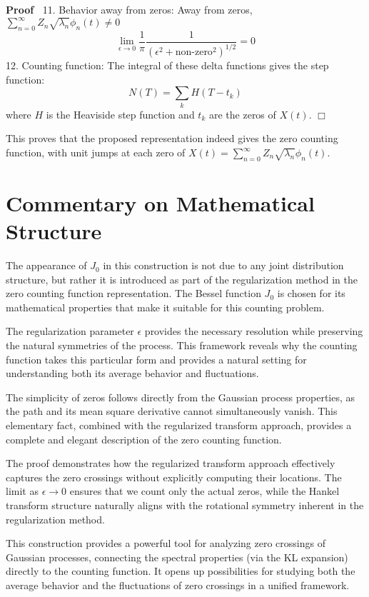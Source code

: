 \documentclass{article}
\newenvironment{proof}{\noindent\textbf{Proof\ }}{\hspace*{\fill}$\Box$\medskip}
\begin{document}
\begin{proof}
  11. Behavior away from zeros: Away from zeros, $\sum_{n = 0}^{\infty} Z_n 
  \sqrt{\lambda_n} \phi_n (t) \neq 0$
  \begin{equation}
    \lim_{\epsilon \to 0}  \frac{1}{\pi}  \frac{1}{(\epsilon^2 +
    \text{non-zero}^2)^{1 / 2}} = 0
  \end{equation}
  12. Counting function: The integral of these delta functions gives the step
  function:
  \begin{equation}
    N (T) = \sum_k H (T - t_k)
  \end{equation}
  where $H$ is the Heaviside step function and $t_k$ are the zeros of $X (t)$.
\end{proof}

This proves that the proposed representation indeed gives the zero counting
function, with unit jumps at each zero of $X (t) = \sum_{n = 0}^{\infty} Z_n 
\sqrt{\lambda_n} \phi_n (t)$.

\section*{Commentary on Mathematical Structure}

The appearance of $J_0$ in this construction is not due to any joint
distribution structure, but rather it is introduced as part of the
regularization method in the zero counting function representation. The Bessel
function $J_0$ is chosen for its mathematical properties that make it suitable
for this counting problem.

The regularization parameter $\epsilon$ provides the necessary resolution
while preserving the natural symmetries of the process. This framework reveals
why the counting function takes this particular form and provides a natural
setting for understanding both its average behavior and fluctuations.

The simplicity of zeros follows directly from the Gaussian process properties,
as the path and its mean square derivative cannot simultaneously vanish. This
elementary fact, combined with the regularized transform approach, provides a
complete and elegant description of the zero counting function.

The proof demonstrates how the regularized transform approach effectively
captures the zero crossings without explicitly computing their locations. The
limit as $\epsilon \to 0$ ensures that we count only the actual zeros, while
the Hankel transform structure naturally aligns with the rotational symmetry
inherent in the regularization method.

This construction provides a powerful tool for analyzing zero crossings of
Gaussian processes, connecting the spectral properties (via the KL expansion)
directly to the counting function. It opens up possibilities for studying both
the average behavior and the fluctuations of zero crossings in a unified
framework.
\end{document}
